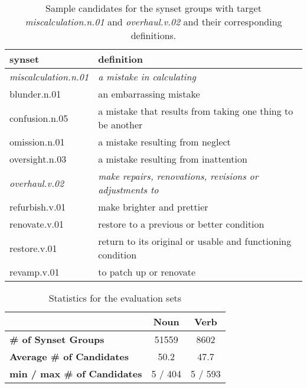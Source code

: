 \documentclass[11pt,a4paper]{article}
\begin{document}

  
\begin{table*}
    \centering
    \begin{tabular}{l|l}
    \hline
    \textbf{synset} & \textbf{definition} \\ \hline
     \emph{miscalculation.n.01} & \emph{a mistake in calculating} \\
     blunder.n.01 & an embarrassing mistake \\
     confusion.n.05 & a mistake that results from taking one thing to be another \\
     omission.n.01 & a mistake resulting from neglect \\
     oversight.n.03 & a mistake resulting from inattention \\ \hline
     \emph{overhaul.v.02} & \emph{make repairs, renovations, revisions or adjustments to} \\
     refurbish.v.01 & make brighter and prettier \\
     renovate.v.01 & restore to a previous or better condition \\
     restore.v.01 & return to its original or usable and functioning condition \\
     revamp.v.01 & to patch up or renovate \\ \hline

    \end{tabular}
    \caption{Sample candidates for the synset groups with target \emph{miscalculation.n.01} and \emph{overhaul.v.02} and their corresponding definitions.} 
    \label{tab:dataset_samples}
\end{table*}


\begin{table}
    \centering
    \begin{tabular}{l|cc}
    \hline
         & \textbf{Noun} & \textbf{Verb} \\ \hline
         \textbf{\# of Synset Groups} & 51559 & 8602 \\
         \textbf{Average \# of Candidates} & 50.2 & 47.7 \\
         \textbf{min / max \# of Candidates} & 5 / 404 & 5 / 593 \\ \hline
    \end{tabular}
    \caption{Statistics for the evaluation sets}
    \label{tab:dataset_stats}
\end{table}
\end{document}
